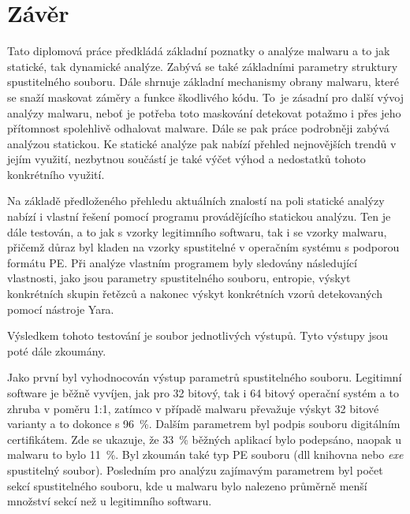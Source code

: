 \section{Závěr}

Tato diplomová práce předkládá základní poznatky o analýze malwaru a to jak statické, tak dynamické analýze. Zabývá se také základními parametry struktury spustitelného souboru. Dále shrnuje základní mechanismy obrany malwaru, které se snaží maskovat záměry a funkce škodlivého kódu. To~je zásadní pro další vývoj analýzy malwaru, neboť je potřeba toto maskování detekovat potažmo i přes jeho přítomnost spolehlivě odhalovat malware. Dále se pak práce podrobněji zabývá analýzou statickou. Ke statické analýze pak nabízí přehled nejnovějších trendů v jejím využití, nezbytnou součástí je také výčet výhod a nedostatků tohoto konkrétního využití.

Na základě předloženého přehledu aktuálních znalostí na poli statické analýzy nabízí i vlastní řešení pomocí programu provádějícího statickou analýzu. Ten je dále testován, a to jak s vzorky legitimního softwaru, tak i se vzorky malwaru, přičemž důraz byl kladen na vzorky spustitelné v operačním systému s podporou formátu PE. Při analýze vlastním programem byly sledovány následující vlastnosti, jako jsou parametry spustitelného souboru, entropie, výskyt konkrétních skupin řetězců a nakonec výskyt konkrétních vzorů detekovaných pomocí nástroje Yara.

Výsledkem tohoto testování je soubor jednotlivých výstupů. Tyto výstupy jsou poté dále zkoumány.

Jako první byl vyhodnocován výstup parametrů spustitelného souboru. Legitimní software je běžně vyvíjen, jak pro 32 bitový, tak i 64 bitový operační systém a to zhruba v poměru 1:1, zatímco v případě malwaru převažuje výskyt 32 bitové varianty a to dokonce s 96~\%. Dalším parametrem byl podpis souboru digitálním certifikátem. Zde se ukazuje, že 33~\% běžných aplikací bylo podepsáno, naopak u malwaru to bylo 11~\%.  Byl zkoumán také typ PE souboru (dll knihovna nebo \emph{exe} spustitelný soubor). Posledním pro analýzu zajímavým parametrem byl počet sekcí spustitelného souboru, kde u malwaru bylo nalezeno průměrně menší množství sekcí než u legitimního softwaru.

